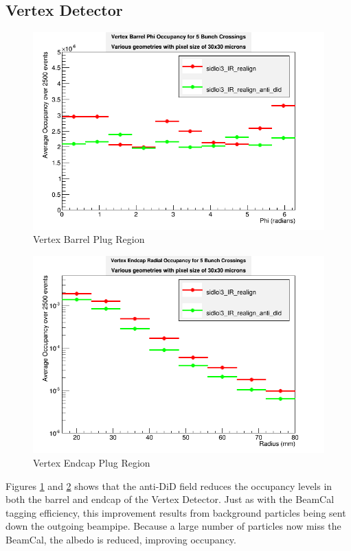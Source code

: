 \documentclass{report}
\begin{document}
            \subsection{Vertex Detector}
                \begin{figure}[H] 
                    \includegraphics[width=\textwidth]{VradOccupancy_base_brl}
                    \centering
                    \caption{Vertex Barrel Plug Region}
                    \label{fig:did_vertex_brl}
                \end{figure}
                \begin{figure}[H] 
                    \includegraphics[width=\textwidth]{VradOccupancy_base_ecp}
                    \centering
                    \caption{Vertex Endcap Plug Region}
                    \label{fig:did_vertex_ecp}
                \end{figure}
                Figures \ref{fig:did_vertex_brl} and \ref{fig:did_vertex_ecp} shows that the anti-DiD field reduces the occupancy levels in both the barrel and endcap of the Vertex Detector. Just as with the BeamCal tagging efficiency, this improvement results from background particles being sent down the outgoing beampipe. Because a large number of particles now miss the BeamCal, the albedo is reduced, improving occupancy.
\end{document}
